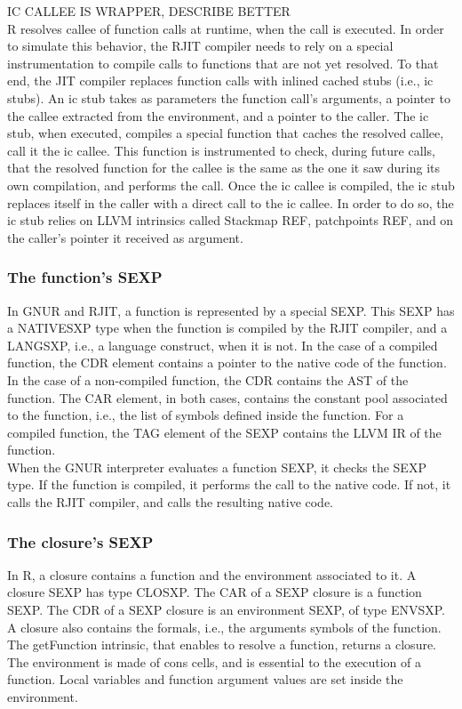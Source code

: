 IC CALLEE IS WRAPPER, DESCRIBE BETTER\\
R resolves callee of function calls at runtime, when the call is executed.
In order to simulate this behavior, the RJIT compiler needs to rely on a special instrumentation to compile calls to functions that are not yet resolved.
To that end, the JIT compiler replaces function calls with inlined cached stubs (i.e., ic stubs).
An ic stub takes as parameters the function call's arguments, a pointer to the callee extracted from the environment, and a pointer to the caller.
The ic stub, when executed, compiles a special function that caches the resolved callee, call it the ic callee.
This function is instrumented to check, during future calls, that the resolved function for the callee is the same as the one it saw during its own compilation, and performs the call.
Once the ic callee is compiled, the ic stub replaces itself in the caller with a direct call to the ic callee.
In order to do so, the ic stub relies on LLVM intrinsics called Stackmap REF, patchpoints REF, and on the caller's pointer it received as argument.\\

\subsubsection{The function's SEXP}
In GNUR and RJIT, a function is represented by a special SEXP. 
This SEXP has a NATIVESXP type when the function is compiled by the RJIT compiler, and a LANGSXP, i.e., a language construct, when it is not.
In the case of a compiled function, the CDR element contains a pointer to the native code of the function.
In the case of a non-compiled function, the CDR contains the AST of the function.
The CAR element, in both cases, contains the constant pool associated to the function, i.e., the list of symbols defined inside the function.
For a compiled function, the TAG element of the SEXP contains the LLVM IR of the function.\\

When the GNUR interpreter evaluates a function SEXP, it checks the SEXP type. 
If the function is compiled, it performs the call to the native code. 
If not, it calls the RJIT compiler, and calls the resulting native code.\\

\subsubsection{The closure's SEXP}
In R, a closure contains a function and the environment associated to it.
A closure SEXP has type CLOSXP.
The CAR of a SEXP closure is a function SEXP.
The CDR of a SEXP closure is an environment SEXP, of type ENVSXP.
A closure also contains the formals, i.e., the arguments symbols of the function.
The getFunction intrinsic, that enables to resolve a function, returns a closure.
The environment is made of cons cells, and is essential to the execution of a function.
Local variables and function argument values are set inside the environment.\\

